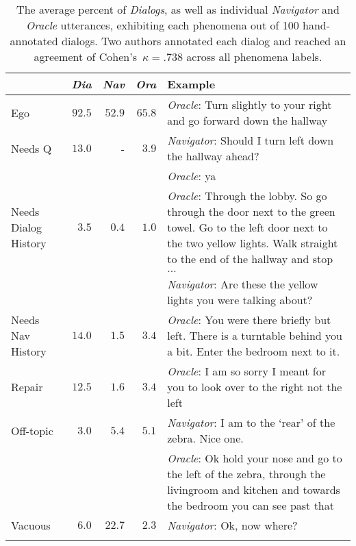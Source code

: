\documentclass{article}
\newcommand{\nav}{\textit{Navigator}}
\newcommand{\ora}{\textit{Oracle}}
\begin{document}
\begin{table}[ht]
\centering
\begin{small}
\begin{tabular}{p{1.4cm}rrrp{8.5cm}}
    & \textbf{\textit{Dia}} & \textbf{\textit{Nav}} & \textbf{\textit{Ora}} & \textbf{Example} \\
    \toprule
    Ego & $92.5$ & $52.9$ & $65.8$ & \ora{}: Turn slightly to {\color{blue}your right} and go {\color{blue}forward} down the hallway \\
    \cmidrule{5-5}
    Needs Q & $13.0$ & - & $3.9$ & \nav{}: Should I turn left down the hallway ahead? \\
    & & & &  \ora{}: {\color{blue}ya} \\
    \cmidrule{5-5}
    Needs Dialog History & $3.5$ & $0.4$ & $1.0$ & \ora{}: Through the lobby. So go through the door next to the green towel. Go to the left door next to {\color{blue}the two yellow lights}. Walk straight to the end of the hallway and stop \\
    & & & & $\dots$ \\
    & & & & \nav{}: Are these {\color{blue}the yellow lights} you were talking about? \\
    \cmidrule{5-5}
    Needs Nav History & $14.0$ & $1.5$ & $3.4$ & \ora{}: {\color{blue}You were there briefly but left}. There is a turntable behind you a bit. Enter the bedroom next to it. \\
    \cmidrule{5-5}
    Repair & $12.5$ & $1.6$ & $3.4$ & \ora{}: I am so sorry {\color{blue}I meant for you to look over to the right not the left} \\
    \cmidrule{5-5}
    Off-topic & $3.0$ & $5.4$ & $5.1$ & \nav{}: I am to the `rear' of the zebra. {\color{blue}Nice one.} \\
    & & & & \ora{}: {\color{blue}Ok hold your nose} and go to the left of the zebra, through the livingroom and kitchen and towards the bedroom you can see past that \\
    \cmidrule{5-5}
    Vacuous & $6.0$ & $22.7$ & $2.3$ & \nav{}: {\color{blue}Ok, now where?} \\
    \bottomrule \\
\end{tabular}
\end{small}
\caption{
The average percent of \textit{Dialogs}, as well as individual \nav{} and \ora{} utterances, exhibiting each phenomena out of 100 hand-annotated dialogs.
Two authors annotated each dialog and reached an agreement of Cohen's~$\kappa=.738$ across all phenomena labels.
}
\vspace{-8mm}
\label{tab:analysis}
\end{table}
\end{document}
